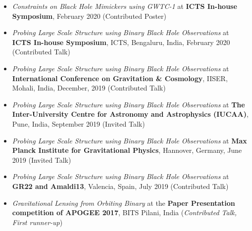\documentclass[11pt, margin, centered, letterpaper]{res}
\begin{document}
\begin{resume}
\begin{itemize}[leftmargin=*]
			\item \textit{Constraints on Black Hole Mimickers using GWTC-1} at \textbf{ICTS In-house Symposium}, February 2020 (Contributed Poster)
			\item \textit{Probing Large Scale Structure using Binary Black Hole Observations} at \textbf{ICTS In-house Symposium}, ICTS, Bengaluru, India, February 2020 (Contributed Talk)
			\item \textit{Probing Large Scale Structure using Binary Black Hole Observations} at \textbf{International Conference on Gravitation \& Cosmology}, IISER, Mohali, India, December, 2019 (Contributed Talk)
			\item \textit{Probing Large Scale Structure using Binary Black Hole Observations} at \textbf{The Inter-University Centre for Astronomy and Astrophysics (IUCAA)}, Pune, India, September 2019 (Invited Talk)
			\item \textit{Probing Large Scale Structure using Binary Black Hole Observations} at \textbf{Max Planck Institute for Gravitational Physics}, Hannover, Germany, June 2019 (Invited Talk)
			\item \textit{Probing Large Scale Structure using Binary Black Hole Observations} at \textbf{GR22 and Amaldi13}, Valencia, Spain, July 2019 (Contributed Talk)
			\item \textit{Gravitational Lensing from Orbiting Binary} at the \textbf{Paper Presentation competition of APOGEE 2017}, BITS Pilani, India (\textit{Contributed Talk, First runner-up})
			
		\end{itemize}
		

\end{resume}
\end{document}

